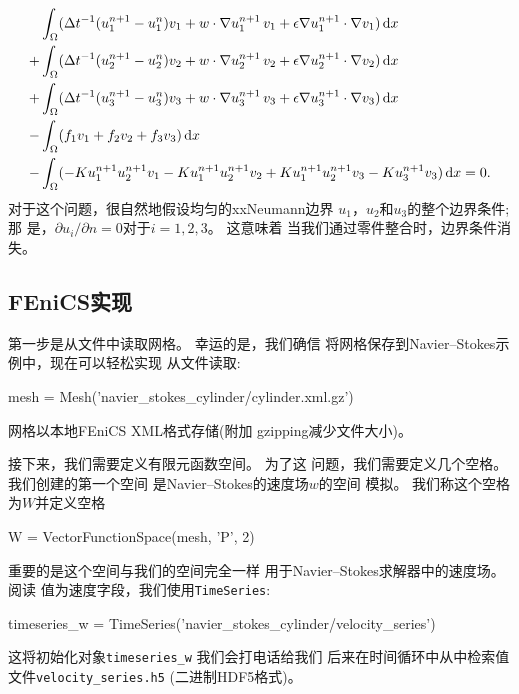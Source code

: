 \begin{align}
  \label{ftut1:reactionsystem:varproblem}
  & \int_{\Omega}
  (\Delta t^{-1} (u_1^{n+1} - u_1^n) v_1 + w \cdot \nabla u^{n+1}_1 \, v_1
  + \epsilon \nabla u^{n+1}_1 \cdot \nabla v_1) \, \mathrm{d}x \\
  + & \int_{\Omega} (\Delta t^{-1} (u_2^{n+1} - u_2^n) v_2
  + w \cdot \nabla u^{n+1}_2 \, v_2
  + \epsilon \nabla u^{n+1}_2 \cdot \nabla v_2) \, \mathrm{d}x \nonumber \\
  + & \int_{\Omega} (\Delta t^{-1} (u_3^{n+1} - u_3^n) v_3
  + w \cdot \nabla u^{n+1}_3 \, v_3
  + \epsilon \nabla u^{n+1}_3 \cdot \nabla v_3) \, \mathrm{d}x \nonumber \\
  - & \int_{\Omega} (f_1 v_1 + f_2 v_2 + f_3 v_3) \, \mathrm{d}x \nonumber \\
  - & \int_{\Omega} (-K u^{n+1}_1 u^{n+1}_2 v_1 - K u^{n+1}_1
  u^{n+1}_2 v_2 + K u^{n+1}_1 u^{n+1}_2 v_3 - K u^{n+1}_3 v_3) \, \mathrm{d}x = 0.
  \nonumber
\end{align}
对于这个问题，很自然地假设均匀的xxNeumann边界
$u_1$，$u_2$和$u_3$的整个边界条件; 那
是，$\partial u_i/\partial n = 0$对于$i = 1, 2, 3$。 这意味着
当我们通过零件整合时，边界条件消失。

\subsection{FEniCS实现}

第一步是从文件中读取网格。 幸运的是，我们确信
将网格保存到Navier--Stokes示例中，现在可以轻松实现
从文件读取:

\begin{python}
mesh = Mesh('navier_stokes_cylinder/cylinder.xml.gz')
\end{python}
网格以本地FEniCS XML格式存储(附加
gzipping减少文件大小)。

接下来，我们需要定义有限元函数空间。 为了这
问题，我们需要定义几个空格。 我们创建的第一个空间
是Navier--Stokes的速度场$w$的空间
模拟。 我们称这个空格为$W$并定义空格

\begin{python}
W = VectorFunctionSpace(mesh, 'P', 2)
\end{python}
重要的是这个空间与我们的空间完全一样
用于Navier--Stokes求解器中的速度场。 阅读
值为速度字段，我们使用\texttt{TimeSeries}:


\begin{python}
timeseries_w = TimeSeries('navier_stokes_cylinder/velocity_series')
\end{python}
这将初始化对象\verb!timeseries_w! 我们会打电话给我们
后来在时间循环中从中检索值
文件\verb!velocity_series.h5! (二进制HDF5格式)。

